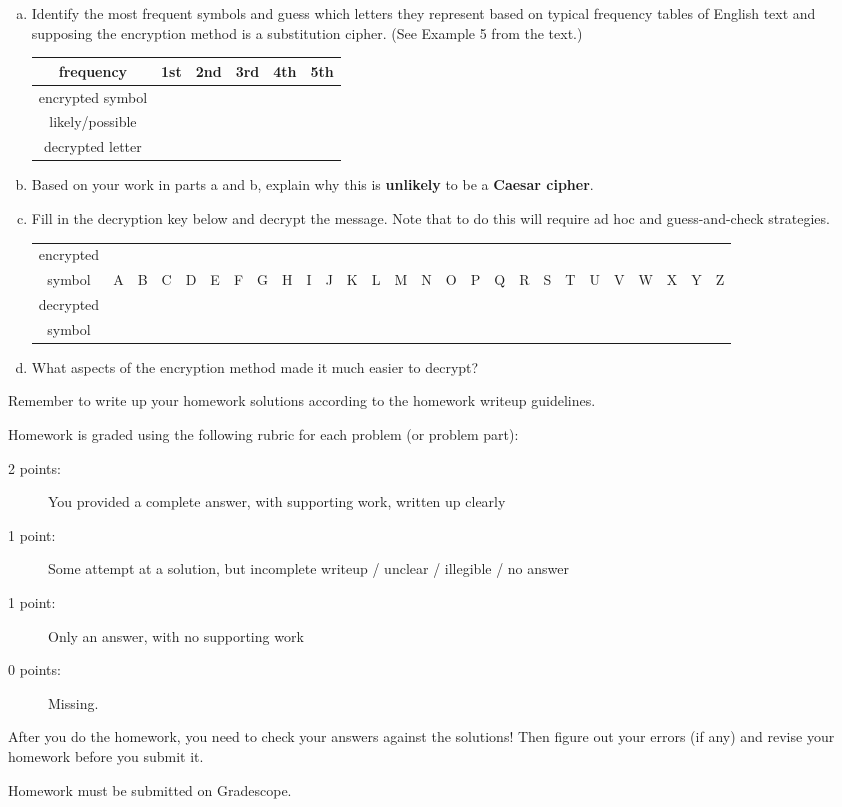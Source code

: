 \documentclass[11pt, oneside]{article}   	%
\begin{document}
	\begin{enumerate}[(a)]
	\item Identify the most frequent symbols and guess which letters they represent based on typical frequency tables of English text and supposing the encryption method is a substitution cipher. (See Example 5 from the text.) \\
	\begin{tabular}{c||c|c|c|c|c}
	frequency&1st&2nd&3rd&4th&5th\\
	\hline
	encrypted symbol&&&&&\\
	\hline
	likely/possible&&&&&\\
	decrypted letter&&&&&\\
	\end{tabular}
	\item Based on your work in parts a and b, explain why this is \textbf{unlikely} to be a \textbf{Caesar cipher}. 
	\item Fill in the decryption key below and decrypt  the message. Note that to do this will require ad hoc and guess-and-check strategies.\\
	
\begingroup
\setlength{\tabcolsep}{4pt}
\renewcommand{\arraystretch}{0.5}
	\hspace*{-0.2in}\begin{tabular}{c|c|c|c|c|c|c|c|c|c|c|c|c|c|c|c|c|c|c|c|c|c|c|c|c|c|c}
	encrypted &&&&&&&&&& &&&&&&&&&& &&&&&&\\
	symbol&A&B&C&D&E&F&G&H&I&J&K&L&M&N&O&P&Q&R&S&T&U&V&W&X&Y&Z\\ \hline
	decrypted &&&&&&&&&& &&&&&&&&&& &&&&&&\\
	symbol&&&&&&&&&& &&&&&&&&&& &&&&&&\\ 
	\end{tabular}
	
\endgroup

\item What aspects of the encryption method made it much easier to decrypt?
	\end{enumerate}

\hrulefill

Remember to write up your homework solutions according to the homework writeup guidelines. 

Homework is graded using the following rubric for each problem (or problem part):

\begin{description}
\item[2 points:] You provided a complete answer, with supporting work, written up clearly
\item[1 point:] Some attempt at a solution, but incomplete writeup / unclear / illegible / no answer
\item[1 point:] Only an answer, with no supporting work 
\item[0 points:] Missing.
\end{description}

After you do the homework, you need to check your answers against the solutions! Then figure out your errors (if any) and revise your homework before you submit it. 

Homework must be submitted on Gradescope.
\end{document}
